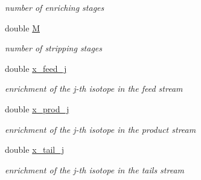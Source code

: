 \begin{DoxyCompactItemize}
\begin{DoxyCompactList}\small\item\em number of enriching stages \end{DoxyCompactList}\item 
\mbox{\label{classpyne_1_1enrichment_1_1_cascade_a9a337df5a380a86cf1d814c817fcaa37}} 
double \hyperlink{classpyne_1_1enrichment_1_1_cascade_a9a337df5a380a86cf1d814c817fcaa37}{M}
\begin{DoxyCompactList}\small\item\em number of stripping stages \end{DoxyCompactList}\item 
\mbox{\label{classpyne_1_1enrichment_1_1_cascade_a40bd847719e323d5a1fbab988aa9ed51}} 
double \hyperlink{classpyne_1_1enrichment_1_1_cascade_a40bd847719e323d5a1fbab988aa9ed51}{x\+\_\+feed\+\_\+j}
\begin{DoxyCompactList}\small\item\em enrichment of the \hyperlink{classpyne_1_1enrichment_1_1_cascade_a2f10dd5529b00a38bd8ecaf49253de28}{j}-\/th isotope in the feed stream \end{DoxyCompactList}\item 
\mbox{\label{classpyne_1_1enrichment_1_1_cascade_ae1247279b655305c5878ed79c956da3d}} 
double \hyperlink{classpyne_1_1enrichment_1_1_cascade_ae1247279b655305c5878ed79c956da3d}{x\+\_\+prod\+\_\+j}
\begin{DoxyCompactList}\small\item\em enrichment of the \hyperlink{classpyne_1_1enrichment_1_1_cascade_a2f10dd5529b00a38bd8ecaf49253de28}{j}-\/th isotope in the product stream \end{DoxyCompactList}\item 
\mbox{\label{classpyne_1_1enrichment_1_1_cascade_a448b12f981c8c76ca2e7f9c2dcce6b59}} 
double \hyperlink{classpyne_1_1enrichment_1_1_cascade_a448b12f981c8c76ca2e7f9c2dcce6b59}{x\+\_\+tail\+\_\+j}
\begin{DoxyCompactList}\small\item\em enrichment of the \hyperlink{classpyne_1_1enrichment_1_1_cascade_a2f10dd5529b00a38bd8ecaf49253de28}{j}-\/th isotope in the tails stream \end{DoxyCompactList}\item 

\end{DoxyCompactItemize}
